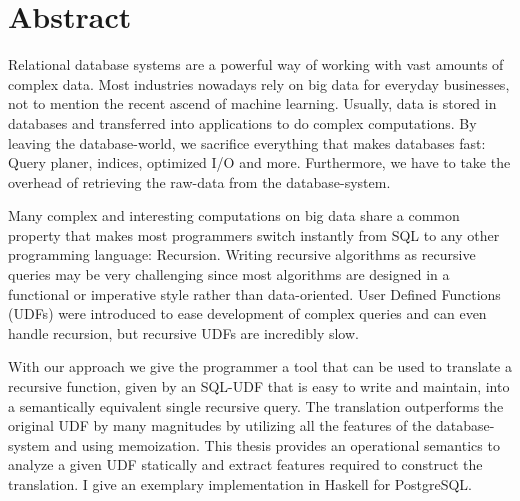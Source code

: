 \section*{Abstract}
Relational database systems are a powerful way of working with vast amounts of complex data. Most industries nowadays rely on big data for everyday businesses, not to mention the recent ascend of machine learning. Usually, data is stored in databases and transferred into applications to do complex computations. By leaving the database-world, we sacrifice everything that makes databases fast: Query planer, indices, optimized I/O and more. Furthermore, we have to take the overhead of retrieving the raw-data from the database-system.

Many complex and interesting computations on big data share a common property that makes most programmers switch instantly from SQL to any other programming language: Recursion. Writing recursive algorithms as recursive queries may be very challenging since most algorithms are designed in a functional or imperative style rather than data-oriented. User Defined Functions (UDFs) were introduced to ease development of complex queries and can even handle recursion, but recursive UDFs are incredibly slow.

With our approach we give the programmer a tool that can be used to translate a recursive function, given by an SQL-UDF that is easy to write and maintain, into a semantically equivalent single recursive query. The translation outperforms the original UDF by many magnitudes by utilizing all the features of the database-system and using memoization. This thesis provides an operational semantics to analyze a given UDF statically and extract features required to construct the translation. I give an exemplary implementation in Haskell for PostgreSQL.